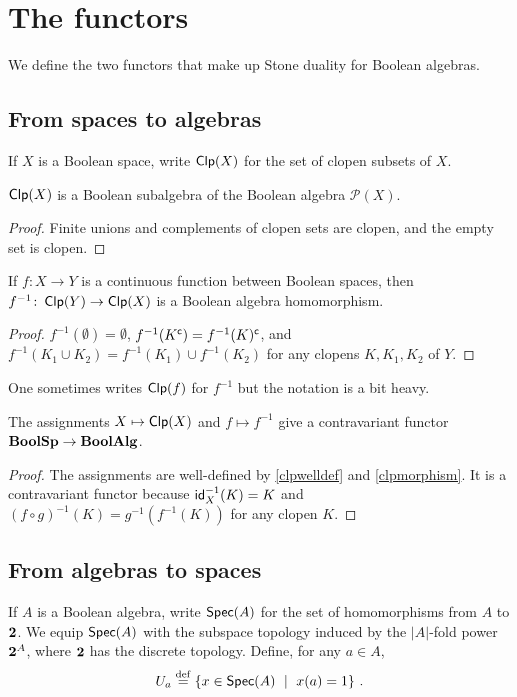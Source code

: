 \documentclass[a4paper]{article}
\begin{document}
\section{The functors}
We define the two functors that make up Stone duality for Boolean algebras.

\subsection{From spaces to algebras}
If $X$ is a Boolean space, write $\operatorname*{\mathsf{Clp}}(X)$ for the set of clopen
subsets of $X$. 

\begin{proposition}\label{clpwelldef}
    $\operatorname*{\mathsf{Clp}}(X)$ is a Boolean subalgebra of the Boolean algebra $\mathcal{P}(X)$.
\end{proposition}
\begin{proof}
Finite unions and complements of clopen sets are clopen, and the empty set is
clopen.
\end{proof} 
\begin{proposition}\label{clpmorphism}
    If $f \colon X \to Y$ is a
continuous function between Boolean spaces, then $f^{-1} \colon \operatorname*{\mathsf{Clp}}(Y) \to \operatorname*{\mathsf{Clp}}(X)$ is a Boolean
algebra homomorphism.
\end{proposition}
\begin{proof}
    $f^{-1}(\emptyset) = \emptyset$, $f^{-1}(K^{\mathsf{c}}) =
f^{-1}(K)^{\mathsf{c}}$, and $f^{-1}(K_1 \cup K_2) = f^{-1}(K_1) \cup f^{-1}(K_2)$ for
any clopens $K, K_1, K_2$ of $Y$. 
\end{proof}
One sometimes writes $\operatorname*{\mathsf{Clp}}(f)$ for
$f^{-1}$ but the notation is a bit heavy.

\begin{proposition}
    The assignments $X \mapsto \operatorname*{\mathsf{Clp}}(X)$ and $f \mapsto f^{-1}$ give a
contravariant functor $\mathbf{BoolSp} \to \mathbf{BoolAlg}$.
\end{proposition}
\begin{proof}
    The assignments are well-defined by \cref{clpwelldef} and
    \cref{clpmorphism}.
It is a contravariant functor because $\mathsf{id}_X^{-1}(K) = K$ and $(f
\circ g)^{-1}(K) = g^{-1}(f^{-1}(K))$ for any clopen $K$.
\end{proof}

\subsection{From algebras to spaces}
If $A$ is a Boolean algebra, write
$\operatorname*{\mathsf{Spec}}(A)$ for the set of homomorphisms from $A$ to $\mathbf{2}$. 
We equip $\operatorname*{\mathsf{Spec}}(A)$ with the subspace topology induced by the $|A|$-fold power
$\mathbf{2}^{A}$, where $\mathbf{2}$ has the discrete topology.
Define, for any $a \in A$,
\[ U_a \stackrel{\mathrm{def}}{=} \{ x \in \operatorname*{\mathsf{Spec}}(A) \ \mid \ x(a) = 1 \} \ . \]
\end{document}
